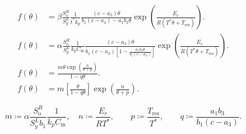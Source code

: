 \documentclass[
    8pt,
    aspectratio=1610,
    c,
    intlimits,
    leqno,
    professionalfonts,
]{beamer}
\begin{document}
\begin{frame}
	\begin{align*}
		f\left(\theta\right) & =
		\beta
		\frac{S^{R}_{\text{o}}}{S^{L}_{y}}
		\frac{1}{t^{\ast}k_{p}}
		\frac{
			\left(c-a_{3}\right)\theta}{
			b_{1}
			\left(c-a_{3}\right)-
			a_{1}
			b_{3}
			\theta
		}
		\exp
		\left(
		\frac{E_{r}}{
			R\left(T^{\ast}\theta+T_{\text{res}}\right)
		}
		\right).                                                      \\
		f\left(\theta\right) & =
		\alpha
		\frac{S^{R}_{\text{o}}}{S^{L}_{y}}
		\frac{1}{k_{p}C_{\text{m}}}
		\frac{
		\left(c-a_{3}\right)\theta}{
		b_{1}
		\left(c-a_{3}\right)
		\left[
		1-\frac{a_{1}b_{3}\theta}{b_{1}\left(c-a_{3}\right)}
		\right]
		}
		\exp
		\left(
		\frac{E_{r}}{
			R\left(T^{\ast}\theta+T_{\text{res}}\right)
		}
		\right).                                                      \\
		f\left(\theta\right) & =
		\frac{m\theta\exp\left(\frac{n}{\theta+p}\right)}{1-q\theta}. \\
		f\left(\theta\right) & =
		m\left[\frac{\theta}{1-q\theta}\right]
		\exp\left(\frac{n}{\theta+p}\right).
	\end{align*}

	\begin{equation*}
		m\coloneqq \alpha\frac{S^{R}_{\text{o}}}{S^{L}_{y}b_{1}}
		\frac{1}{k_{p}C_{\text{m}}},\quad
		n\coloneqq \frac{E_{r}}{RT^{\ast}},\qquad
		p\coloneqq \frac{T_{\text{res}}}{T^{\ast}},\qquad
		q\coloneqq \frac{a_{1}b_{3}}{b_{1}\left(c-a_{3}\right)}.
	\end{equation*}
\end{frame}
\end{document}
